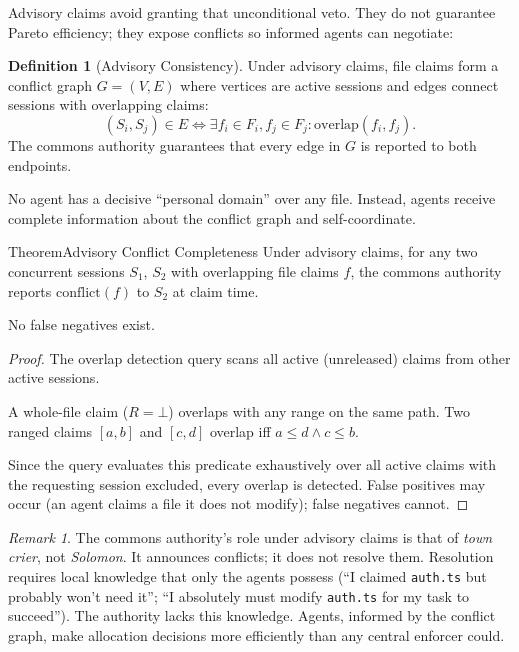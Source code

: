 \documentclass[11pt,a4paper]{article}
\theoremstyle{definition}
\newtheorem{definition}{Definition}[section]
\theoremstyle{remark}
\newtheorem*{remark}{Remark}
\begin{document}
Advisory claims avoid granting that unconditional veto. They do not guarantee Pareto efficiency; they expose conflicts so informed agents can negotiate:

\begin{definition}[Advisory Consistency]\label{def:advisory}
\setlength{\parskip}{4pt plus 1pt}
Under advisory claims, file claims form a conflict graph $G = (V, E)$ where vertices are active sessions and edges connect sessions with overlapping claims:
\[
(S_i, S_j) \in E \iff \exists f_i \in F_i, f_j \in F_j : \text{overlap}(f_i, f_j).
\]
The commons authority guarantees that every edge in $G$ is reported to both endpoints. 

No agent has a decisive ``personal domain'' over any file. Instead, agents receive complete information about the conflict graph and self-coordinate.
\end{definition}

\begin{pdclaim}{Theorem}{Advisory Conflict Completeness}
\setlength{\parskip}{4pt plus 1pt}
\label{thm:advisory}
Under advisory claims, for any two concurrent sessions $S_1$, $S_2$ with overlapping file claims $f$, the commons authority reports $\text{conflict}(f)$ to $S_2$ at claim time. 

No false negatives exist.
\end{pdclaim}

\begin{proof}
\setlength{\parskip}{4pt plus 1pt}
The overlap detection query scans all active (unreleased) claims from other active sessions. 

A whole-file claim ($R = \bot$) overlaps with any range on the same path. Two ranged claims $[a,b]$ and $[c,d]$ overlap iff $a \leq d \land c \leq b$. 

Since the query evaluates this predicate exhaustively over all active claims with the requesting session excluded, every overlap is detected. False positives may occur (an agent claims a file it does not modify); false negatives cannot.
\end{proof}

\begin{remark}
The commons authority's role under advisory claims is that of \emph{town crier}, not \emph{Solomon}. It announces conflicts; it does not resolve them. Resolution requires local knowledge that only the agents possess (``I claimed \texttt{auth.ts} but probably won't need it''; ``I absolutely must modify \texttt{auth.ts} for my task to succeed''). The authority lacks this knowledge. Agents, informed by the conflict graph, make allocation decisions more efficiently than any central enforcer could.
\end{remark}
\end{document}

